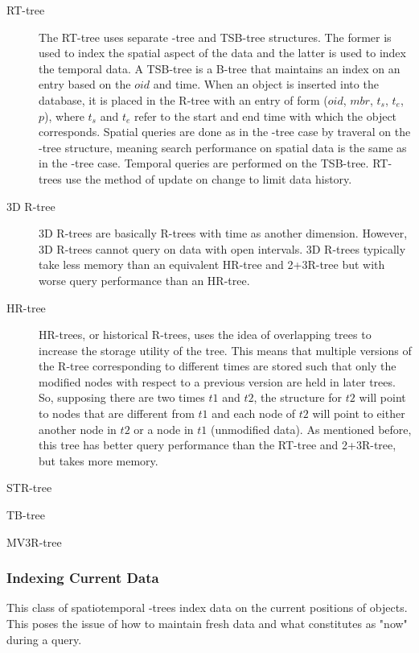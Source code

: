 \begin{description}
	\item[RT-tree] The RT-tree\cite{xu1990rt} uses separate \rbase-tree and 
	TSB-tree structures. The former is used 
	to index the spatial aspect of the data and the latter is used to index
	the temporal data. A TSB-tree is a B-tree that maintains an index on an 
	entry based on the $oid$ and time. When an object is inserted into the 
	database, it is placed in the R-tree with an entry of form 
	($oid$, $mbr$, $t_s$, $t_e$, $p$), where $t_s$ and $t_e$ refer to the 
	start and end time with which the object corresponds. Spatial queries 
	are done as in the \rbase-tree case by traveral on the \rbase-tree 
	structure, meaning search performance on spatial data is the same as in 
	the \rbase-tree case. Temporal queries are performed on the TSB-tree. 
	RT-trees use the method of update on change to limit data history.
	\item[3D R-tree] 3D R-trees \cite{nascimento1999evaluation} are basically
	R-trees with time as another dimension. However, 3D R-trees cannot 
	query on data with open intervals. 3D R-trees typically take less
	memory than an equivalent HR-tree and 2+3R-tree but with worse query 
	performance than an HR-tree.
	\item[HR-tree] HR-trees, or historical R-trees, 
	\cite{nascimento1999evaluation} uses the idea of overlapping trees to 
	increase the storage utility of the tree. This means that multiple 
	versions of the R-tree corresponding to different times are stored such 
	that only the modified nodes with respect to a previous version are 
	held in later trees. So, supposing there are two times $t1$ and $t2$, the
	structure for $t2$ will point to nodes that are different from $t1$ and
	each node of $t2$ will point to either another node in $t2$ or a node in
	$t1$ (unmodified data). As mentioned before, this tree has better query
	performance than the RT-tree and 2+3R-tree, but takes more memory.
	\item[STR-tree] \cite{pfoser2000novel}
	\item[TB-tree] \cite{pfoser2000novel}
	\item[MV3R-tree] \cite{tao2001mv3r}
\end{description}

\subsubsection{Indexing Current Data}
This class of spatiotemporal \rbase-trees index data on the current positions of 
objects. This poses the issue of how to maintain fresh data and what constitutes 
as "now" during a query. 


